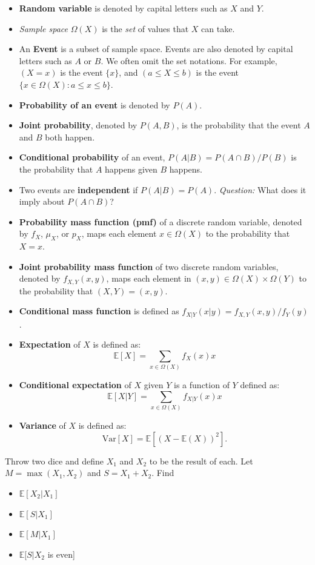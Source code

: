 \documentclass{discussion}
\begin{document}
\newcommand{\var}{\mathrm{Var}}
\renewcommand{\E}{\mathbb{E}}

\begin{itemize}
\item \textbf{Random variable} is denoted by capital letters such as $X$ and $Y$.
\item \textit{Sample space} $\Omega(X)$ is the \textit{set} of values that $X$ can take.
\item An \textbf{Event} is a subset of sample space. Events are also denoted by capital letters such as $A$ or $B$. We often omit the set notations. For example, $(X = x)$ is the event $\{x\}$, and $(a \leq X \leq b)$ is the event $\{x \in \Omega(X): a \leq x \leq b\}$.
\item \textbf{Probability of an event} is denoted by $P(A)$.
\item \textbf{Joint probability}, denoted by $P(A,B)$, is the probability that the event $A$ and $B$ both happen.
\item \textbf{Conditional probability} of an event, $P(A | B) = P(A \cap B) / P(B)$ is the probability that $A$ happens given $B$ happens.
\item Two events are \textbf{independent} if $P(A | B) = P(A)$. \textit{Question:} What does it imply about $P(A \cap B)$?
\item \textbf{Probability mass function (pmf)} of a discrete random variable, denoted by $f_X$, $\mu_X$, or $p_X$, maps each element $x \in \Omega(X)$ to the probability that $X = x$.
\item \textbf{Joint probability mass function} of two discrete random variables, denoted by $f_{X,Y}(x, y)$, maps each element in $(x,y) \in \Omega(X) \times \Omega(Y)$ to the probability that $(X,Y) = (x,y)$.
\item \textbf{Conditional mass function} is defined as $f_{X|Y}(x | y) = f_{X,Y}(x,y) / f_Y(y)$.
\item \textbf{Expectation} of $X$ is defined as:
\[\E[X] = \sum_{x \in \Omega(X)} f_X(x) x \]
\item \textbf{Conditional expectation} of $X$ given $Y$ is a function of $Y$ defined as:
\[\E[X | Y] = \sum_{x \in \Omega(X)} f_{X | Y}(x) x \]
\item \textbf{Variance} of $X$ is defined as:
\[\var[X] = \E[(X - \E(X))^2].\]
\end{itemize}

\vspace{1em}

\begin{exercise}
Throw two dice and define $X_1$ and $X_2$ to be the result of each. Let $M = \max(X_1, X_2)$ and $S = X_1 + X_2$. Find 
\begin{itemize}
\item $\E[X_2 | X_1]$
\item $\E[S | X_1]$
\item $\E[M | X_1]$
\item $\E[S | X_2$ is even]
\end{itemize}
\end{exercise}
\end{document}
